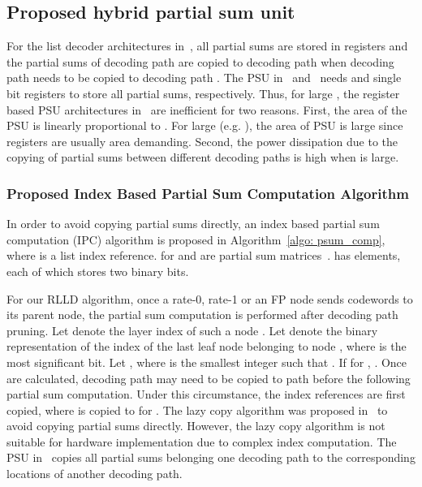 \documentclass[journal]{IEEEtran}
\begin{document}
\subsection{Proposed hybrid partial sum unit} \label{ssec: top_archi}
For the list decoder architectures in~\cite{tree_list_dec, jun_low_mem_list}, all partial sums are stored in registers and the partial sums of decoding path  are copied to decoding path  when decoding path  needs to be copied to decoding path . The PSU in~\cite{tree_list_dec} and~\cite{jun_low_mem_list} needs  and  single bit registers to store all partial sums, respectively. Thus, for large , the register based PSU architectures in~\cite{tree_list_dec, jun_low_mem_list} are inefficient for two reasons. First, the area of the PSU is linearly proportional to . For large  (e.g. ), the area of PSU is large since registers are usually area demanding. Second, the power dissipation due to the copying of partial sums between different decoding paths is high when  is large. 
\subsubsection{Proposed Index Based Partial Sum Computation Algorithm} \label{ssec: mld}
In order to avoid copying partial sums directly, an index based partial sum computation (IPC) algorithm is proposed in Algorithm~\ref{algo: psum_comp}, where  is a list index reference.  for  and  are partial sum matrices~\cite{ido_it, jun_low_mem_list}.  has  elements, each of which stores two binary bits.

For our RLLD algorithm, once a rate-0, rate-1 or an FP node sends  codewords to its parent node, the partial sum computation is performed after decoding path pruning. Let  denote the layer index of such a node . Let  denote the binary representation of the index of the last leaf node belonging to node , where  is the most significant bit. Let , where  is the smallest integer such that . If  for , .
Once  are calculated, decoding path  may need to be copied to path  before the following partial sum computation. Under this circumstance, the index references are first copied, where  is copied to  for . The lazy copy algorithm was proposed in~\cite{ido_it} to avoid copying partial sums directly. However, the lazy copy algorithm is not suitable for hardware implementation due to complex index computation. The PSU in~\cite{jun_low_mem_list} copies all partial sums belonging one decoding path to the corresponding locations of another decoding path.
\end{document}
